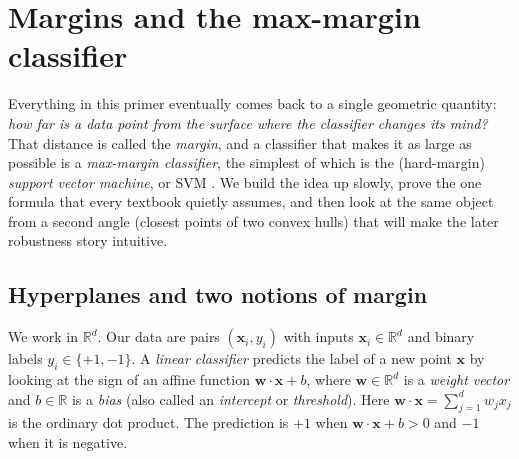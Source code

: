 
\section{Margins and the max-margin classifier}
\label{sec:margins}

Everything in this primer eventually comes back to a single geometric
quantity: \emph{how far is a data point from the surface where the
classifier changes its mind?} That distance is called the \emph{margin},
and a classifier that makes it as large as possible is a
\emph{max-margin classifier}, the simplest of which is the
(hard-margin) \emph{support vector machine}, or SVM
\citep{boser1992, cortes1995, vapnik}. We build the idea up slowly,
prove the one formula that every textbook quietly assumes, and then
look at the same object from a second angle (closest points of two
convex hulls) that will make the later robustness story intuitive.

\subsection{Hyperplanes and two notions of margin}

We work in $\mathbb{R}^d$. Our data are pairs $(\mathbf{x}_i, y_i)$ with
inputs $\mathbf{x}_i \in \mathbb{R}^d$ and binary labels
$y_i \in \{+1, -1\}$. A \emph{linear classifier} predicts the label of a
new point $\mathbf{x}$ by looking at the sign of an affine function
$\mathbf{w}\cdot\mathbf{x} + b$, where $\mathbf{w}\in\mathbb{R}^d$ is a
\emph{weight vector} and $b\in\mathbb{R}$ is a \emph{bias} (also called an
\emph{intercept} or \emph{threshold}). Here $\mathbf{w}\cdot\mathbf{x}
= \sum_{j=1}^d w_j x_j$ is the ordinary dot product. The prediction is
$+1$ when $\mathbf{w}\cdot\mathbf{x}+b>0$ and $-1$ when it is negative.

